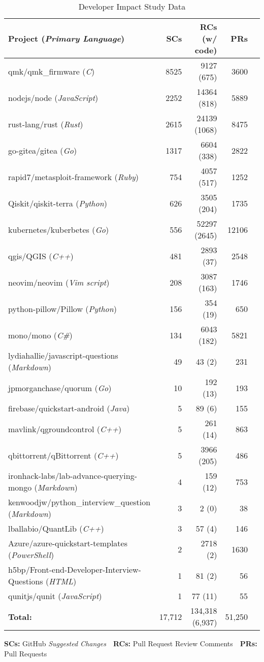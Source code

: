 \begin{table*}[tbhp]
\centering
\caption{Developer Impact Study Data}
\begin{tabularx}{\textwidth}{ lrrrr } \hline
  \textbf{Project} (\textit{Primary Language}) & \textbf{SCs} & \textbf{RCs (w/ code)} & \textbf{PRs} \\ \hline
 qmk/qmk\_firmware (\textit{C}) & 8525 & 9127 (675) & 3600 \\
 nodejs/node (\textit{JavaScript}) & 2252 & 14364 (818) & 5889 \\
 rust-lang/rust (\textit{Rust}) & 2615 & 24139 (1068) & 8475 \\
 go-gitea/gitea (\textit{Go}) & 1317 & 6604 (338) & 2822 \\
 rapid7/metasploit-framework (\textit{Ruby}) & 754 & 4057 (517) & 1252 \\
 Qiskit/qiskit-terra (\textit{Python}) &  626 & 3505 (204) & 1735 \\
 kubernetes/kuberbetes (\textit{Go}) & 556 & 52297 (2645) & 12106 \\
 qgis/QGIS (\textit{C++}) & 481 & 2893 (37) & 2548 \\
 neovim/neovim (\textit{Vim script}) & 208 & 3087 (163) & 1746 \\
 python-pillow/Pillow (\textit{Python}) & 156 & 354 (19) & 650 \\
 mono/mono (\textit{C\#}) & 134 & 6043 (182) & 5821 \\
 lydiahallie/javascript-questions (\textit{Markdown}) & 49 & 43 (2) & 231 \\
 jpmorganchase/quorum (\textit{Go}) & 10 & 192 (13) & 193 \\ 
 firebase/quickstart-android (\textit{Java}) & 5 & 89 (6) & 155 \\
 mavlink/qgroundcontrol (\textit{C++}) & 5 & 261 (14) & 863 \\
 qbittorrent/qBittorrent (\textit{C++}) & 5 & 3966 (205) & 486 \\
 ironhack-labs/lab-advance-querying-mongo (\textit{Markdown}) & 4 & 159 (12) & 753 \\
 kenwoodjw/python\_interview\_question (\textit{Markdown}) & 3 & 2 (0) & 38 \\
 lballabio/QuantLib (\textit{C++}) & 3 & 57 (4) & 146 \\ 
 Azure/azure-quickstart-templates (\textit{PowerShell}) & 2 & 2718 (2) & 1630 \\
 h5bp/Front-end-Developer-Interview-Questions (\textit{HTML}) & 1 & 81 (2) & 56 \\
 qunitjs/qunit (\textit{JavaScript}) & 1 & 77 (11) & 55 \\
 \hline
 \textbf{Total:} & 17,712 & 134,318 (6,937) &  51,250 \\ \hline

\end{tabularx}
\begin{tablenotes}
\centering
\textbf{SCs:} GitHub \textsl{Suggested Changes}~~\textbf{RCs:} Pull Request Review Comments~~\textbf{PRs:} Pull Requests
\end{tablenotes}
\label{tab:sugg-projects}
\end{table*}